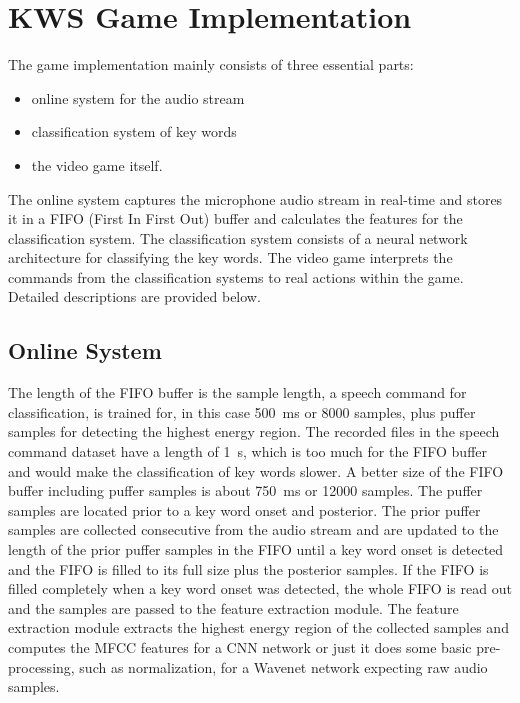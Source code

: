 
\section{KWS Game Implementation}
\thesisStateNotReady
The game implementation mainly consists of three essential parts:
\begin{itemize}
	\item online system for the audio stream
	\item classification system of key words
	\item the video game itself.
\end{itemize}
The online system captures the microphone audio stream in real-time and stores it in a FIFO (First In First Out) buffer and calculates the features for the classification system.
The classification system consists of a neural network architecture for classifying the key words.
The video game interprets the commands from the classification systems to real actions within the game.
Detailed descriptions are provided below.


\subsection{Online System}
The length of the FIFO buffer is the sample length, a speech command for classification, is trained for, in this case \SI{500}{\milli\second} or 8000 samples, plus puffer samples for detecting the highest energy region.
The recorded files in the speech command dataset have a length of \SI{1}{\second}, which is too much for the FIFO buffer and would make the classification of key words slower.
A better size of the FIFO buffer including puffer samples is about \SI{750}{\milli\second} or 12000 samples.
The puffer samples are located prior to a key word onset and posterior.
The prior puffer samples are collected consecutive from the audio stream and are updated to the length of the prior puffer samples in the FIFO until a key word onset is detected and the FIFO is filled to its full size plus the posterior samples.
If the FIFO is filled completely when a key word onset was detected, the whole FIFO is read out and the samples are passed to the feature extraction module.
The feature extraction module extracts the highest energy region of the collected samples and computes the MFCC features for a CNN network or just it does some basic pre-processing, such as normalization, for a Wavenet network expecting raw audio samples.

